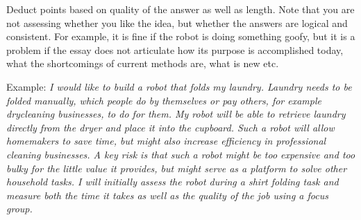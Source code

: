 \documentclass[letter,twoside,11pt]{article}
\begin{document}
Deduct points based on quality of the answer as well as length. Note that you are not assessing whether you like the idea, but whether the answers are logical and consistent. For example, it is fine if the robot is doing something goofy, but it is a problem if the essay does not articulate how its purpose is accomplished today, what the shortcomings of current methods are, what is new etc. 

Example: \emph{I would like to build a robot that folds my laundry. Laundry needs to be folded manually, which people do by themselves or pay others, for example drycleaning businesses, to do for them. My robot will be able to retrieve laundry directly from the dryer and place it into the cupboard. Such a robot will allow homemakers to save time, but might also increase efficiency in professional cleaning businesses. A key risk is that such a robot might be too expensive and too bulky for the little value it provides, but might serve as a platform to solve other household tasks. I will initially assess the robot during a shirt folding task and measure both the time it takes as well as the quality of the job using a focus group.}
\end{document}
